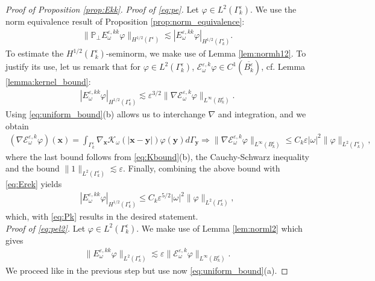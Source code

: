 \documentclass[]{article}
\numberwithin{equation}{section}
\numberwithin{theorem}{section}
\numberwithin{lemma}{section}
\numberwithin{corollary}{section}
\numberwithin{proposition}{section}
\numberwithin{definition}{section}
\newcommand{\mypar}[1]{\noindent\textit{#1}\hspace{0.1em}}
\newcommand{\bx}{\boldsymbol{x}}
\newcommand{\by}{\boldsymbol{y}}
\newcommand{\re}{\varepsilon}
\renewcommand{\vec}{\boldsymbol}
\begin{document}
	\begin{proof}[Proof of Proposition \ref{prop:Ekk}]
		\mypar{Proof of \eqref{eq:pe}. }
		Let $\varphi \in L^2(\Gamma^{\re}_k)$. We use the norm equivalence result of Proposition \ref{prop:norm_equivalence}:
		\begin{align}
			\label{eq:Pk}
			\|\mathbb{P}_{\perp}E^{\re,kk}_{\omega}\varphi\|_{H^{1/2}(\Gamma^{\re})}\lesssim |E^{\re,{kk}}_{\omega}\varphi|_{H^{1/2}(\Gamma^{\re}_k)}.
		\end{align}
		To estimate the $H^{1/2}(\Gamma^{\re}_k)$-seminorm, we make use of Lemma \ref{lem:normh12}. To justify its use, let us remark that for $\varphi\in L^2(\Gamma^{\re}_k)$,  $\mathcal{E}^{\re,k}_{\omega}\varphi\in C^1(\overline{B^{\re}_k})$, cf. Lemma \ref{lemma:kernel_bound}:
		\begin{align}
			\label{eq:Erek}
			|E^{\re,kk}_\omega \varphi |_{H^{1/2}(\Gamma^{\re}_k)}\lesssim \varepsilon^{3/2} \|\nabla \mathcal{E}^{\re,k}_{\omega}\varphi\|_{L^{\infty}(B^{\re}_k)}.
		\end{align}
		Using \eqref{eq:uniform_bound}(b) allows us to interchange $\nabla$ and integration, and we obtain
		\begin{align*}%
			(\nabla \mathcal{E}^{\re,k}_{\omega}\varphi)(\vec{x})=\int_{\Gamma^{\re}_k} \nabla_{\vec{x}}\mathcal{K}_{\omega}(|\bx-\by|)\varphi(\vec{y})d\Gamma_{\vec{y}} \Rightarrow \|\nabla \mathcal{E}^{\re,k}_{\omega}\varphi\|_{L^{\infty}(B_k^{\re})}\leq C_k \re |\omega|^2\|\varphi\|_{L^2(\Gamma^{\re}_k)},
		\end{align*}
		where the last bound follows from \eqref{eq:Kbound}(b), the Cauchy-Schwarz inequality and the bound $\|  1 \|_{L^2(\Gamma^{\re}_k)} \lesssim \re$. Finally, combining the above bound with \eqref{eq:Erek} yields 
		\begin{align*}%
			|E^{\re,kk}_{\omega}\varphi|_{H^{1/2}(\Gamma^{\re}_k)}\leq C_k \varepsilon^{5/2}|\omega|^2\|\varphi\|_{L^2(\Gamma^{\re}_k)},
		\end{align*}
		which, with \eqref{eq:Pk} results in the desired statement.\\
		\mypar{Proof of \eqref{eq:pel2}.} Let $\varphi\in L^2(\Gamma^{\re}_k)$. We make use of Lemma \ref{lem:norml2}  which gives
		\begin{align*}%
			\|E_{\omega}^{\re,kk}\varphi\|_{L^2(\Gamma^{\re}_k)}\lesssim \re	\|\mathcal{E}_{\omega}^{\re,k}\varphi\|_{L^{\infty}(B^{\re}_k)}.
		\end{align*}
		We proceed like in the previous step but use now  \eqref{eq:uniform_bound}(a). 
	\end{proof}
\end{document}
